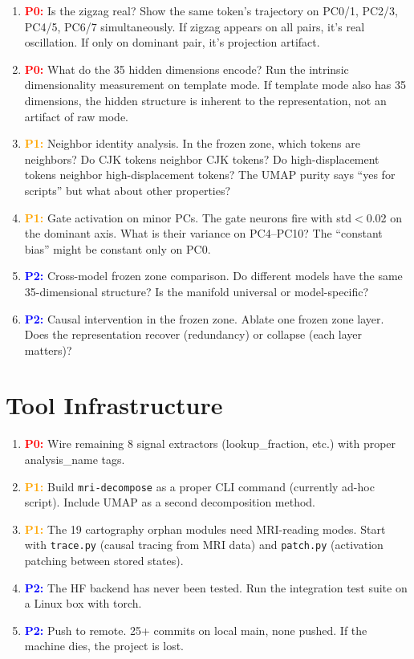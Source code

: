 \documentclass[11pt]{article}
\newcommand{\pri}[1]{\textcolor{red}{\textbf{P0:}} #1}
\newcommand{\sec}[1]{\textcolor{orange}{\textbf{P1:}} #1}
\newcommand{\ter}[1]{\textcolor{blue}{\textbf{P2:}} #1}
\begin{document}
\begin{enumerate}[label=\arabic*.]
\item \pri{Is the zigzag real? Show the same token's trajectory on PC0/1, PC2/3, PC4/5, PC6/7 simultaneously. If zigzag appears on all pairs, it's real oscillation. If only on dominant pair, it's projection artifact.}
\item \pri{What do the 35 hidden dimensions encode? Run the intrinsic dimensionality measurement on template mode. If template mode also has 35 dimensions, the hidden structure is inherent to the representation, not an artifact of raw mode.}
\item \sec{Neighbor identity analysis. In the frozen zone, which tokens are neighbors? Do CJK tokens neighbor CJK tokens? Do high-displacement tokens neighbor high-displacement tokens? The UMAP purity says ``yes for scripts'' but what about other properties?}
\item \sec{Gate activation on minor PCs. The gate neurons fire with std$<$0.02 on the dominant axis. What is their variance on PC4--PC10? The ``constant bias'' might be constant only on PC0.}
\item \ter{Cross-model frozen zone comparison. Do different models have the same 35-dimensional structure? Is the manifold universal or model-specific?}
\item \ter{Causal intervention in the frozen zone. Ablate one frozen zone layer. Does the representation recover (redundancy) or collapse (each layer matters)?}
\end{enumerate}

\section{Tool Infrastructure}

\begin{enumerate}[label=\arabic*.]
\item \pri{Wire remaining 8 signal extractors (lookup\_fraction, etc.) with proper analysis\_name tags.}
\item \sec{Build \texttt{mri-decompose} as a proper CLI command (currently ad-hoc script). Include UMAP as a second decomposition method.}
\item \sec{The 19 cartography orphan modules need MRI-reading modes. Start with \texttt{trace.py} (causal tracing from MRI data) and \texttt{patch.py} (activation patching between stored states).}
\item \ter{The HF backend has never been tested. Run the integration test suite on a Linux box with torch.}
\item \ter{Push to remote. 25+ commits on local main, none pushed. If the machine dies, the project is lost.}
\end{enumerate}
\end{document}
